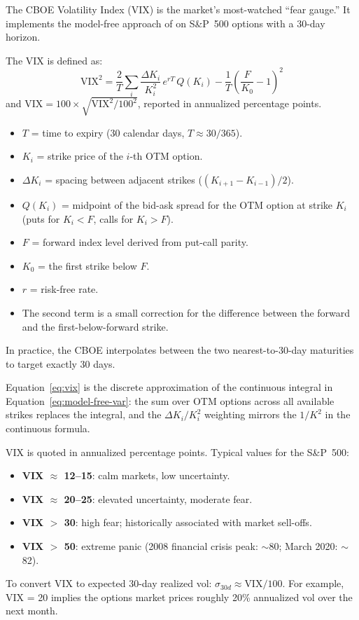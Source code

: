 The CBOE Volatility Index (VIX) is the market's most-watched ``fear gauge.''
It implements the model-free approach of \citet{BrittenJones2000} on S\&P~500 options with a 30-day horizon.

\begin{definition}
\label{def:vix}
The VIX is defined as:
\begin{equation}
  \text{VIX}^2 = \frac{2}{T}\sum_i \frac{\Delta K_i}{K_i^2}\,e^{rT}\, Q(K_i)
  - \frac{1}{T}\left(\frac{F}{K_0} - 1\right)^2
  \label{eq:vix}
\end{equation}
and $\text{VIX} = 100 \times \sqrt{\text{VIX}^2/100^2}$, reported in annualized percentage points.
\begin{itemize}[nosep]
  \item $T$ = time to expiry (30 calendar days, $T \approx 30/365$).
  \item $K_i$ = strike price of the $i$-th OTM option.
  \item $\Delta K_i$ = spacing between adjacent strikes ($(K_{i+1} - K_{i-1})/2$).
  \item $Q(K_i)$ = midpoint of the bid-ask spread for the OTM option at strike $K_i$ (puts for $K_i < F$, calls for $K_i > F$).
  \item $F$ = forward index level derived from put-call parity.
  \item $K_0$ = the first strike below $F$.
  \item $r$ = risk-free rate.
  \item The second term is a small correction for the difference between the forward and the first-below-forward strike.
\end{itemize}
In practice, the CBOE interpolates between the two nearest-to-30-day maturities to target exactly 30 days.
\end{definition}

Equation~\eqref{eq:vix} is the discrete approximation of the continuous integral in Equation~\eqref{eq:model-free-var}: the sum over OTM options across all available strikes replaces the integral, and the $\Delta K_i / K_i^2$ weighting mirrors the $1/K^2$ in the continuous formula.

\begin{keyidea}
VIX is quoted in annualized percentage points.
Typical values for the S\&P~500:
\begin{itemize}[nosep]
  \item \textbf{VIX $\approx$ 12--15}: calm markets, low uncertainty.
  \item \textbf{VIX $\approx$ 20--25}: elevated uncertainty, moderate fear.
  \item \textbf{VIX $>$ 30}: high fear; historically associated with market sell-offs.
  \item \textbf{VIX $>$ 50}: extreme panic (2008 financial crisis peak: $\sim$80; March 2020: $\sim$82).
\end{itemize}
To convert VIX to expected 30-day realized vol: $\sigma_{30d} \approx \text{VIX}/100$.
For example, VIX = 20 implies the options market prices roughly 20\% annualized vol over the next month.
\end{keyidea}

